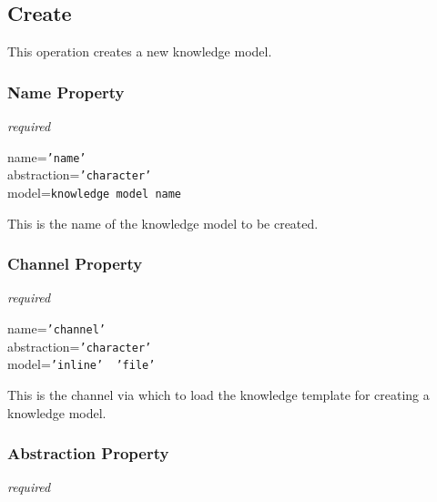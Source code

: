 %
%
%
%
%
%

\subsection{Create}
\label{create_heading}

This operation creates a new knowledge model.

\subsubsection{Name Property}

\emph{required}

name=\texttt{'name'}\\
abstraction=\texttt{'character'}\\
model=\texttt{knowledge model name}

This is the name of the knowledge model to be created.

\subsubsection{Channel Property}

\emph{required}

name=\texttt{'channel'}\\
abstraction=\texttt{'character'}\\
model=\texttt{'inline' \vline\ 'file'}

This is the channel via which to load the knowledge template for creating a
knowledge model.

\subsubsection{Abstraction Property}

\emph{required}


